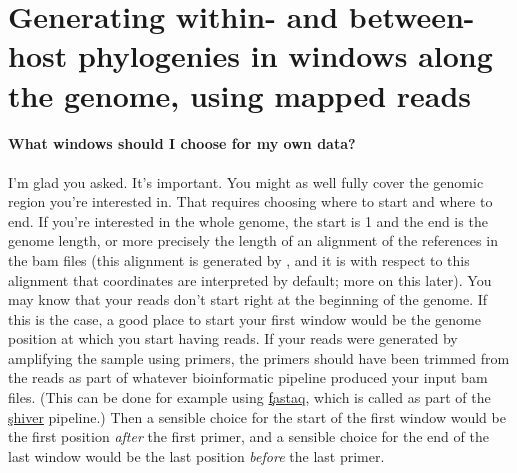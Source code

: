 \part{Generating within- and between-host phylogenies in windows along the genome, using mapped reads}

\subsection*{What windows should I choose for my own data?}
I'm glad you asked.
It's important.
You might as well fully cover the genomic region you're interested in.
That requires choosing where to start and where to end.
If you're interested in the whole genome, the start is 1 and the end is the genome length, or more precisely the length of an alignment of the references in the bam files (this alignment is generated by \p, and it is with respect to this alignment that coordinates are interpreted by default; more on this later).
You may know that your reads don't start right at the beginning of the genome.
If this is the case, a good place to start your first window would be the genome position at which you start having reads.
If your reads were generated by amplifying the sample using primers, the primers should have been trimmed from the reads as part of whatever bioinformatic pipeline produced your input bam files.
(This can be done for example using \href{https://github.com/sanger-pathogens/Fastaq}{\c{fastaq}}, which is called as part of the \href{https://github.com/ChrisHIV/shiver}{\c{shiver}} pipeline.)
Then a sensible choice for the start of the first window would be the first position {\it after} the first primer, and a sensible choice for the end of the last window would be the last position {\it before} the last primer.

